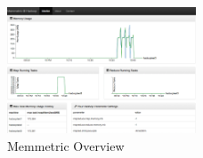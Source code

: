 \begin{figure}[h!]
  \caption{Memmetric Overview}
  \centering
    \includegraphics[width=0.5\textwidth]{image/overview.png}
\end{figure}